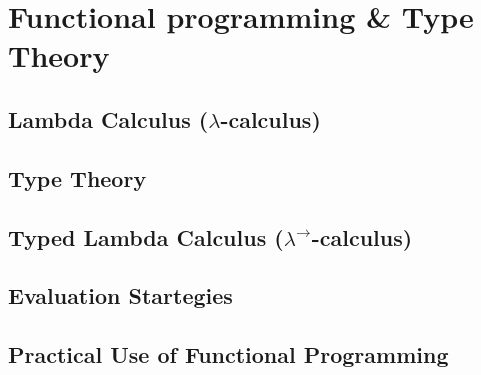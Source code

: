 

\chapter{Functional programming \& Type Theory}

\section{Lambda Calculus ($\lambda$-calculus)}

\section{Type Theory}

\section{Typed Lambda Calculus ($\lambda^\rightarrow$-calculus)}

\section{Evaluation Startegies}

\section{Practical Use of Functional Programming}
